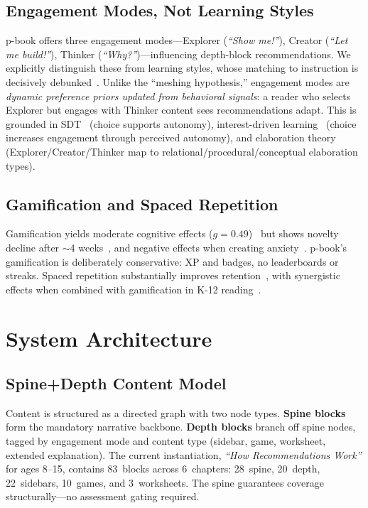 \documentclass[sigconf]{acmart}
\begin{document}
\subsection{Engagement Modes, Not Learning Styles}

p-book offers three engagement modes---Explorer (\emph{``Show me!''}), Creator (\emph{``Let me build!''}), Thinker (\emph{``Why?''})---influencing depth-block recommendations. We explicitly distinguish these from learning styles, whose matching to instruction is decisively debunked~\cite{pashler2008,touloumakos2023}. Unlike the ``meshing hypothesis,'' engagement modes are \emph{dynamic preference priors updated from behavioral signals}: a reader who selects Explorer but engages with Thinker content sees recommendations adapt. This is grounded in SDT~\cite{ryan2000} (choice supports autonomy), interest-driven learning~\cite{schraw1998} (choice increases engagement through perceived autonomy), and elaboration theory~\cite{reigeluth1999} (Explorer/Creator/Thinker map to relational/procedural/conceptual elaboration types).

\subsection{Gamification and Spaced Repetition}

Gamification yields moderate cognitive effects ($g{=}0.49$)~\cite{sailer2020} but shows novelty decline after ${\sim}$4 weeks~\cite{koivisto2022}, and negative effects when creating anxiety~\cite{almeida2022}. p-book's gamification is deliberately conservative: XP and badges, no leaderboards or streaks. Spaced repetition substantially improves retention~\cite{cepeda2006}, with synergistic effects when combined with gamification in K-12 reading~\cite{yeh2016}.

\section{System Architecture}

\subsection{Spine+Depth Content Model}

Content is structured as a directed graph with two node types. \textbf{Spine blocks} form the mandatory narrative backbone. \textbf{Depth blocks} branch off spine nodes, tagged by engagement mode and content type (sidebar, game, worksheet, extended explanation). The current instantiation, \emph{``How Recommendations Work''} for ages 8--15, contains 83~blocks across 6~chapters: 28~spine, 20~depth, 22~sidebars, 10~games, and 3~worksheets. The spine guarantees coverage structurally---no assessment gating required.
\end{document}

